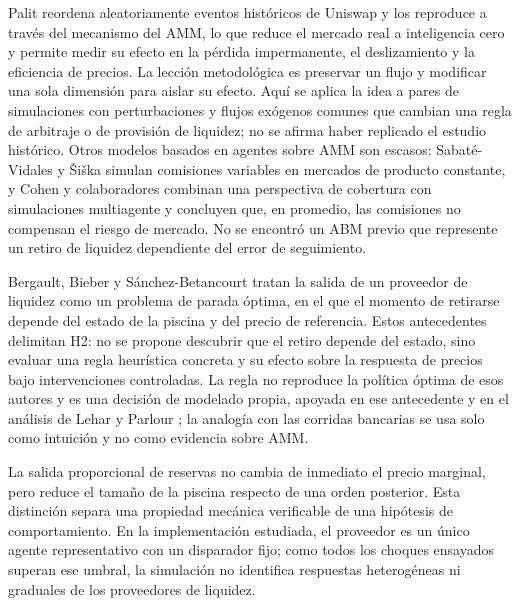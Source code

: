 Palit \cite{palit2022shuffled} reordena aleatoriamente eventos históricos de Uniswap y los reproduce a través del mecanismo del AMM, lo que reduce el mercado real a inteligencia cero y permite medir su efecto en la pérdida impermanente, el deslizamiento y la eficiencia de precios. La lección metodológica es preservar un flujo y modificar una sola dimensión para aislar su efecto. Aquí se aplica la idea a pares de simulaciones con perturbaciones y flujos exógenos comunes que cambian una regla de arbitraje o de provisión de liquidez; no se afirma haber replicado el estudio histórico. Otros modelos basados en agentes sobre AMM son escasos: Sabaté-Vidales y Šiška \cite{sabatevidales2023variable} simulan comisiones variables en mercados de producto constante, y Cohen y colaboradores \cite{cohen2023inefficiency} combinan una perspectiva de cobertura con simulaciones multiagente y concluyen que, en promedio, las comisiones no compensan el riesgo de mercado. No se encontró un ABM previo que represente un retiro de liquidez dependiente del error de seguimiento.

Bergault, Bieber y Sánchez-Betancourt \cite{bergault2025exit} tratan la salida de un proveedor de liquidez como un problema de parada óptima, en el que el momento de retirarse depende del estado de la piscina y del precio de referencia. Estos antecedentes delimitan H2: no se propone descubrir que el retiro depende del estado, sino evaluar una regla heurística concreta y su efecto sobre la respuesta de precios bajo intervenciones controladas. La regla no reproduce la política óptima de esos autores y es una decisión de modelado propia, apoyada en ese antecedente y en el análisis de Lehar y Parlour \cite{lehar2025uniswap}; la analogía con las corridas bancarias \cite{diamond1983bank} se usa solo como intuición y no como evidencia sobre AMM.

La salida proporcional de reservas no cambia de inmediato el precio marginal, pero reduce el tamaño de la piscina respecto de una orden posterior. Esta distinción separa una propiedad mecánica verificable de una hipótesis de comportamiento. En la implementación estudiada, el proveedor es un único agente representativo con un disparador fijo; como todos los choques ensayados superan ese umbral, la simulación no identifica respuestas heterogéneas ni graduales de los proveedores de liquidez.


